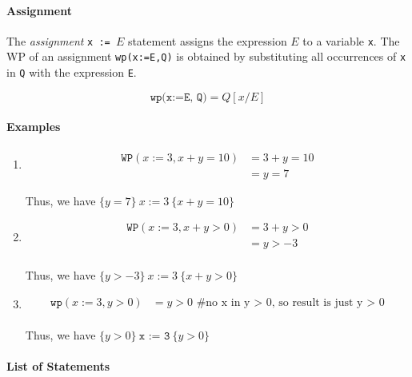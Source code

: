 \documentclass[oneside,11pt,dvipsnames]{book}
\newcommand{\code}[1]{\texttt{#1}}
\begin{document}
\paragraph{Assignment} The \emph{assignment} \code{x\ :=\ $E$} statement assigns the expression
$E$ to a variable \code{x}. The WP of an assignment \code{wp(x:=E,Q)} is obtained by substituting all occurrences of
\code{x} in \code{Q} with the expression \code{E}. 

\begin{equation}\label{eq:wp-assign}
    \code{wp(x:=E, Q)} = Q[x/E]
\end{equation}

\paragraph{Examples}
\begin{enumerate}
\item      
\begin{equation*}
    \begin{split}
        \code{WP}(x:=3, x + y = 10) &= 3 + y = 10\\ 
        &= y = 7
    \end{split}
\end{equation*}

Thus, we have $\{y=7\} ~x := 3~ \{x + y = 10\}$

\item 
\begin{equation*}
    \begin{split}
 \code{WP}(x:=3, x + y > 0) &= 3 + y > 0  \\
 &= y > -3\\
    \end{split}
\end{equation*}


Thus, we have $\{y > -3\}  ~x := 3~ \{x + y> 0\}$

\item 
\begin{equation*}
    \begin{split}
        \code{wp}(x:=3, y > 0) &= y > 0 \text{ \# no x in y > 0, so result is just y > 0}\\
    \end{split}    
\end{equation*}

Thus, we have $\{y > 0\}  ~\code{x := 3}~ \{y > 0\}$
\end{enumerate}


\paragraph{List of Statements}\label{list-of-statements}
\end{document}
